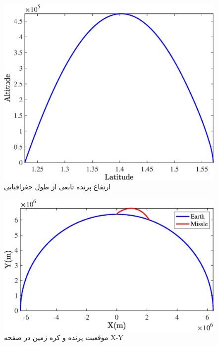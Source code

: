 \begin{figure}[H]
	\centering
	\includegraphics[width=.75\linewidth]{../Figure/Q1/c/lat_vs_alt}
	\caption{ارتفاع پرنده تابعی از طول جغرافیایی}
\end{figure}

\begin{figure}[H]
	\centering
	\includegraphics[width=.75\linewidth]{../Figure/Q1/c/xy_earth}
	\caption{موفعیت پرنده و کره زمین در صفحه X-Y}
\end{figure}

